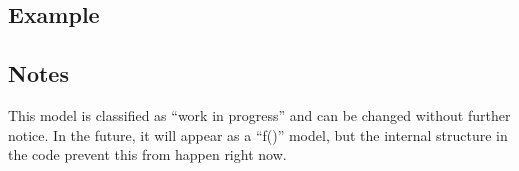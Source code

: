 \documentclass[a4paper,11pt]{article}
\begin{document}
\subsection*{Example}




\subsection*{Notes}

This model is classified as ``work in progress'' and can be changed
without further notice. In the future, it will appear as a ``f()''
model, but the internal structure in the code prevent this from happen
right now.
\end{document}
